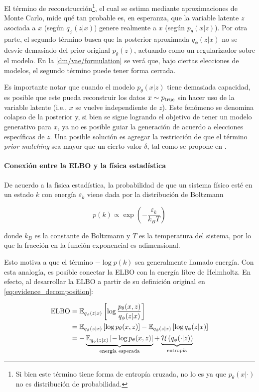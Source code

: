 El término de reconstrucción\footnote{Si bien este término tiene forma de entropía cruzada, no lo es ya que $p_\theta(x|\cdot)$ no es distribución de probabilidad.}, el cual se estima mediante aproximaciones de Monte Carlo, mide qué tan probable es, en esperanza, que la variable latente $z$ asociada a $x$ (según $q_\phi(z|x)$) genere realmente a $x$ (según $p_\theta(x|z)$). Por otra parte, el segundo término busca que la posterior aproximada $q_\phi(z|x)$ no se desvíe demasiado del prior original $p_\theta(z)$, actuando como un regularizador sobre el modelo. En la \autoref{dm/vae/formulation} se verá que, bajo ciertas elecciones de modelos, el segundo término puede tener forma cerrada.

Es importante notar que cuando el modelo $p_\theta(x|z)$ tiene demasiada capacidad, es posible que este pueda reconstruir los datos $x\sim p_{\operatorname{true}}$ sin hacer uso de la variable latente (i.e., $x$ se vuelve independiente de $z$). Este fenómeno se denomina colapso de la posterior y, si bien se sigue logrando el objetivo de tener un modelo generativo para $x$, ya no es posible guiar la generación de acuerdo a elecciones específicas de $z$. Una posible solución es agregar la restricción de que el término \textit{prior matching} sea mayor que un cierto valor $\delta$, tal como se propone en \cite{razavi2019preventing}.

\paragraph{Conexión entre la ELBO y la física estadística}

De acuerdo a la física estadística, la probabilidad de que un sistema físico esté en un estado $k$ con energía $\varepsilon_k$ viene dada por la distribución de Boltzmann

\begin{equation}
	\label{eq:boltzmann}
	p(k) \propto \exp\left(-\frac{\varepsilon_k}{k_B T}\right)
\end{equation}

donde $k_B$ es la constante de Boltzmann y $T$ es la temperatura del sistema, por lo que la fracción en la función exponencial es adimensional.

Esto motiva a que el término $-\log p(k)$ sea generalmente llamado energía. Con esta analogía, es posible conectar la ELBO con la energía libre de Helmholtz. En efecto, al desarrollar la ELBO a partir de su definición original en \eqref{eq:evidence_decomposition}:

\begin{align*}
	\operatorname{ELBO} &= \mathbb{E}_{q_\phi(z|x)}\left[\log\frac{p_\theta(x,z)}{q_\phi(z|x)}\right]\\
    & = \mathbb{E}_{q_\phi(z|x)}\left[\log p_\theta(x,z)\right] - \mathbb{E}_{q_\phi(z|x)}\left[\log q_\phi(z|x)\right] \\
	& = -\underbrace{\mathbb{E}_{q_\phi(z|x)}\left[-\log p_\theta(x,z)\right]}_{\text{energía esperada}} + \underbrace{\mathcal{H}\left(q_\phi(\cdot|z)\right)}_{\text{entropía}}
\end{align*}

